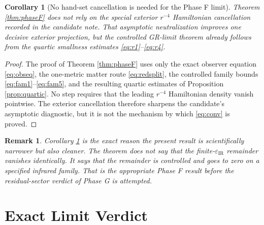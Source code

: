 \documentclass[11pt]{article}
\newcommand{\IRsmall}{\varepsilon_{\mathrm{IR}}}
\newtheorem{remark}{Remark}
\newtheorem{corollary}{Corollary}
\begin{document}
\begin{corollary}[No hand-set cancellation is needed for the Phase F limit]
\label{cor:nohand}
Theorem \ref{thm:phaseF} does not rely on the special exterior \(r^{-4}\) Hamiltonian cancellation recorded in the candidate note. That asymptotic neutralization improves one decisive exterior projection, but the controlled GR-limit theorem already follows from the quartic smallness estimates \eqref{eq:r1}--\eqref{eq:r4}.
\end{corollary}

\begin{proof}
The proof of Theorem \ref{thm:phaseF} uses only the exact observer equation \eqref{eq:obseq}, the one-metric matter route \eqref{eq:redsplit}, the controlled family bounds \eqref{eq:fam1}--\eqref{eq:fam5}, and the resulting quartic estimates of Proposition \ref{prop:quartic}. No step requires that the leading \(r^{-4}\) Hamiltonian density vanish pointwise. The exterior cancellation therefore sharpens the candidate's asymptotic diagnostic, but it is not the mechanism by which \eqref{eq:conv} is proved.
\end{proof}

\begin{remark}
Corollary \ref{cor:nohand} is the exact reason the present result is scientifically narrower but also cleaner. The theorem does not say that the finite-\(\IRsmall\) remainder vanishes identically. It says that the remainder is controlled and goes to zero on a specified infrared family. That is the appropriate Phase F result before the residual-sector verdict of Phase G is attempted.
\end{remark}

\section{Exact Limit Verdict}
\end{document}
